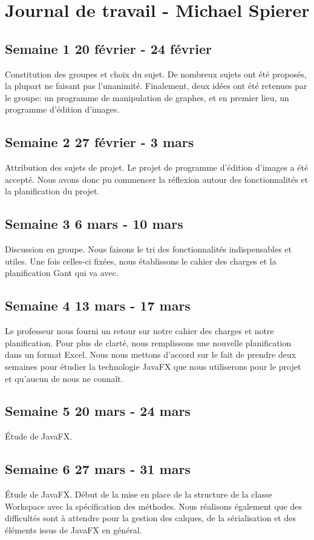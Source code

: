 \section{Journal de travail - Michael Spierer}

\subsection{Semaine 1 20 février - 24 février}
Constitution des groupes et choix du sujet. De nombreux sujets ont été proposés, la plupart ne faisant pas l'unanimité. Finalement, deux idées ont été retenues par le groupe: un programme de manipulation de graphes, et en premier lieu, un programme d'édition d'images.
\subsection{Semaine 2 27 février - 3 mars}
Attribution des sujets de projet. Le projet de programme d'édition d'images a été accepté. Nous avons donc pu commencer la réflexion autour des fonctionnalités et la planification du projet.
\subsection{Semaine 3 6 mars - 10 mars}
Discussion en groupe. Nous faisons le tri des fonctionnalités indispensables et utiles. Une fois celles-ci fixées, nous établissons le cahier des charges et la planification Gant qui va avec.
\subsection{Semaine 4 13 mars - 17 mars}
Le professeur nous fourni un retour sur notre cahier des charges et notre planification. Pour plus de clarté, nous remplissons une nouvelle planification dans un format Excel. Nous nous mettons d'accord sur le fait de prendre deux semaines pour étudier la technologie JavaFX que nous utiliserons pour le projet et qu'aucun de nous ne connaît.
\subsection{Semaine 5 20 mars - 24 mars}
Étude de JavaFX.
\subsection{Semaine 6 27 mars - 31 mars}
Étude de JavaFX. Début de la mise en place de la structure de la classe Workspace avec la spécification des méthodes. Nous réalisons également que des difficultés sont à attendre pour la gestion des calques, de la sérialisation et des éléments issus de JavaFX en général.
